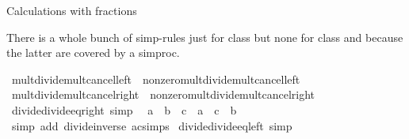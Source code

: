 \begin{isabellebody}
\endisatagproof
{\isafoldproof}%
%
\isadelimproof
%
\endisadelimproof
%
\begin{isamarkuptext}%
Calculations with fractions%
\end{isamarkuptext}\isamarkuptrue%
%
\begin{isamarkuptext}%
There is a whole bunch of simp-rules just for class  but none for class  and 
because the latter are covered by a simproc.%
\end{isamarkuptext}\isamarkuptrue%
\isamarkupfalse%
\ mult{\isacharunderscore}{\kern0pt}divide{\isacharunderscore}{\kern0pt}mult{\isacharunderscore}{\kern0pt}cancel{\isacharunderscore}{\kern0pt}left\ {\isacharequal}{\kern0pt}\ nonzero{\isacharunderscore}{\kern0pt}mult{\isacharunderscore}{\kern0pt}divide{\isacharunderscore}{\kern0pt}mult{\isacharunderscore}{\kern0pt}cancel{\isacharunderscore}{\kern0pt}left\isanewline
\isanewline
{}\isamarkupfalse%
\ mult{\isacharunderscore}{\kern0pt}divide{\isacharunderscore}{\kern0pt}mult{\isacharunderscore}{\kern0pt}cancel{\isacharunderscore}{\kern0pt}right\ {\isacharequal}{\kern0pt}\ nonzero{\isacharunderscore}{\kern0pt}mult{\isacharunderscore}{\kern0pt}divide{\isacharunderscore}{\kern0pt}mult{\isacharunderscore}{\kern0pt}cancel{\isacharunderscore}{\kern0pt}right\isanewline
\isanewline
{}\isamarkupfalse%
\ divide{\isacharunderscore}{\kern0pt}divide{\isacharunderscore}{\kern0pt}eq{\isacharunderscore}{\kern0pt}right\ {\isacharbrackleft}{\kern0pt}simp{\isacharbrackright}{\kern0pt}{\isacharcolon}{\kern0pt}\isanewline
\ \ {\isachardoublequoteopen}a\ {\isacharslash}{\kern0pt}\ {\isacharparenleft}{\kern0pt}b\ {\isacharslash}{\kern0pt}\ c{\isacharparenright}{\kern0pt}\ {\isacharequal}{\kern0pt}\ {\isacharparenleft}{\kern0pt}a\ {\isacharasterisk}{\kern0pt}\ c{\isacharparenright}{\kern0pt}\ {\isacharslash}{\kern0pt}\ b{\isachardoublequoteclose}\isanewline
%
\isadelimproof
\ \ %
\endisadelimproof
%
\isatagproof
{}\isamarkupfalse%
\ {\isacharparenleft}{\kern0pt}simp\ add{\isacharcolon}{\kern0pt}\ divide{\isacharunderscore}{\kern0pt}inverse\ ac{\isacharunderscore}{\kern0pt}simps{\isacharparenright}{\kern0pt}%
\endisatagproof
{\isafoldproof}%
%
\isadelimproof
\isanewline
%
\endisadelimproof
\isanewline
{}\isamarkupfalse%
\ divide{\isacharunderscore}{\kern0pt}divide{\isacharunderscore}{\kern0pt}eq{\isacharunderscore}{\kern0pt}left\ {\isacharbrackleft}{\kern0pt}simp{\isacharbrackright}{\kern0pt}{\isacharcolon}{\kern0pt}\isanewline

\end{isabellebody}
